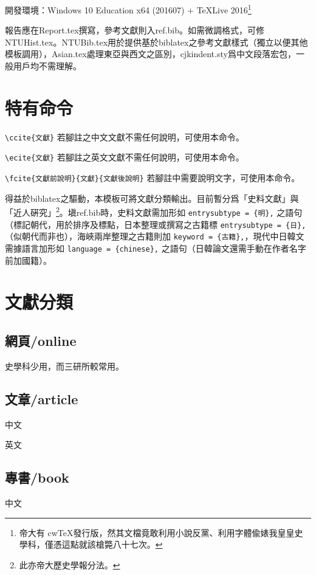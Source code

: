 開發環境：Windows 10 Education x64 (201607) + TeXLive 2016\footnote{\ttfamily 帝大有 cw\TeX 發行版，然其文檔竟敢利用小說反黨、利用字體偸婊我皇皇史學科，僅憑這點就該槍斃八十七次。}

報告應在Report.tex撰寫，參考文獻則入ref.bib。如需微調格式，可修NTUHist.tex。NTUBib.tex用於提供基於biblatex之參考文獻樣式（獨立以便其他模板調用），Asian.tex處理東亞與西文之區別，cjkindent.sty爲中文段落宏包，一般用戶均不需理解。

\section*{特有命令}

\verb|\ccite{文獻}| 若腳註之中文文獻不需任何說明，可使用本命令。

\verb|\ecite{文獻}| 若腳註之英文文獻不需任何說明，可使用本命令。

\verb|\fcite{文獻前說明}{文獻}{文獻後說明}| 若腳註中需要說明文字，可使用本命令。

得益於biblatex之驅動，本模板可將文獻分類輸出。目前暫分爲「史料文獻」與「近人硏究」\footnote{\ttfamily 此亦帝大歷史學報分法。}。塡ref.bib時，史料文獻需加形如 \verb|entrysubtype = {明},| 之語句（標記朝代，用於排序及標點，日本整理或撰寫之古籍標 \verb|entrysubtype = {日},| （似朝代而非也），海峽兩岸整理之古籍則加 \verb|keyword = {古籍},|，現代中日韓文需據語言加形如 \verb|language = {chinese},| 之語句（日韓論文還需手動在作者名字前加國籍）。

\section*{文獻分類}

\subsection*{網頁/online}
史學科少用，而三研所較常用。

\subsection*{文章/article}
中文

英文

\subsection*{專書/book}
中文

